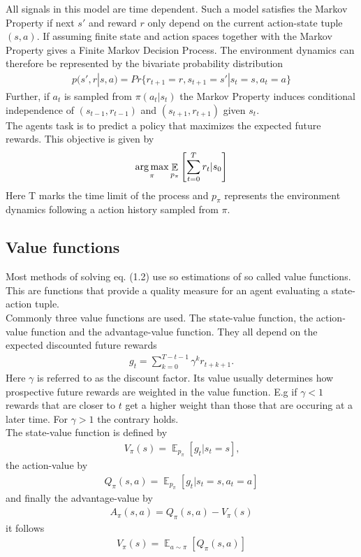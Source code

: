 All signals in this model are time dependent. 
Such a model satisfies the Markov Property if next $s'$ and reward $r$ only depend on the current action-state tuple $(s, a)$. If assuming finite state and action spaces together with the Markov Property gives a Finite Markov Decision Process. The environment dynamics can therefore be represented by the bivariate probability distribution
\begin{align}
	p(s', r|s, a) = Pr\{r_{t+1}=r, s_{t+1} = s' | s_t=s, a_t=a\}
\end{align}
Further, if $a_t$ is sampled from $\pi(a_t|s_t)$ the Markov Property induces conditional independence of $(s_{t-1}, r_{t-1})$ and $(s_{t+1}, r_{t+1})$ given $s_t$. \\

The agents task is to predict a policy that maximizes the expected future rewards. This objective is given by
\begin{align}
	\operatorname*{arg\,max}_{\pi}\mathop{\mathbb{E}}_{p_{\pi}}\left[\sum_{t=0}^T r_t | s_0\right]
\end{align}
Here T marks the time limit of the process and $p_{\pi}$ represents the environment dynamics following a action history sampled from $\pi$.\\

\subsection{Value functions}
Most methods of solving eq. (1.2) use so estimations of so called value functions. This are functions that provide a quality measure for an agent evaluating a state-action tuple. \\
Commonly three value functions are used. The state-value function, the action-value function and the advantage-value function. They all depend on the expected discounted future rewards
\begin{align}
	g_t = \sum^{T-t-1}_{k=0} \gamma^k r_{t+k+1} .
\end{align}
Here $\gamma$ is referred to as the discount factor. Its value usually determines how prospective future rewards are weighted in the value function. E.g if $\gamma<1$ rewards that are closer to $t$ get a higher weight than those that are occuring at a later time. For $\gamma>1$ the contrary holds.\\
The state-value function is defined by
\begin{align}
	V_{\pi}(s) = \mathop{\mathbb{E}}_{p_{\pi}}\left[g_t|s_t=s \right]\text{,}
\end{align}
the action-value by
\begin{align}
	Q_{\pi}(s, a) = \mathop{\mathbb{E}}_{p_{\pi}}\left[g_t|s_t=s, a_t=a \right]
\end{align}
and finally the advantage-value by
\begin{align}
	A_{\pi}(s, a) = Q_{\pi}(s, a) - V_{\pi}(s)
\end{align}
it follows
\begin{align}
	V_{\pi}(s) = \mathop{\mathbb{E}}_{a\sim\pi}\left[ Q_{\pi}(s, a)\right]
\end{align}

